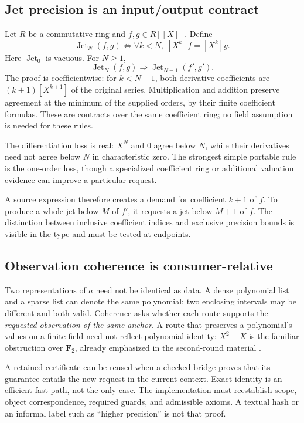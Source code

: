 \documentclass[11pt,letterpaper]{article}
\newcommand{\code}[1]{\texttt{\detokenize{#1}}}
\newcommand{\Jet}{\operatorname{Jet}}
\theoremstyle{definition}
\theoremstyle{remark}
\begin{document}
\subsection{Jet precision is an input/output contract}
Let $R$ be a commutative ring and $f,g\in R[[X]]$. Define
\[
        \Jet_N(f,g)\iff \forall k<N,\ [X^k]f=[X^k]g.
\]
Here $\Jet_0$ is vacuous. For $N\ge1$,
\[
                    \Jet_N(f,g)\Longrightarrow\Jet_{N-1}(f',g').
\]
The proof is coefficientwise: for $k<N-1$, both derivative coefficients are
$(k+1)[X^{k+1}]$ of the original series. Multiplication and addition preserve
agreement at the minimum of the supplied orders, by their finite coefficient
formulas. These are contracts over the same coefficient ring; no field
assumption is needed for these rules.

The differentiation loss is real: $X^N$ and $0$ agree below $N$, while their
derivatives need not agree below $N$ in characteristic zero. The strongest
simple portable rule is the one-order loss, though a specialized coefficient
ring or additional valuation evidence can improve a particular request.

A source expression \code{coefficient k (differentiate f)} therefore creates a
demand for coefficient $k+1$ of $f$. To produce a whole jet below $M$ of $f'$, it
requests a jet below $M+1$ of $f$. The distinction between inclusive coefficient
indices and exclusive precision bounds is visible in the type and must be
tested at endpoints.

\subsection{Observation coherence is consumer-relative}
Two representations of $a$ need not be identical as data. A dense polynomial
list and a sparse list can denote the same polynomial; two enclosing intervals
may be different and both valid. Coherence asks whether each route supports the
\emph{requested observation of the same anchor}. A route that preserves a
polynomial's values on a finite field need not reflect polynomial identity:
$X^2-X$ is the familiar obstruction over $\mathbf F_2$, already emphasized in
the second-round material \cite{syn-a,syn-b}.

A retained certificate can be reused when a checked bridge proves that its
guarantee entails the new request in the current context. Exact identity is an
efficient fast path, not the only case. The implementation must reestablish
scope, object correspondence, required guards, and admissible axioms. A textual
hash or an informal label such as ``higher precision'' is not that proof.
\end{document}
